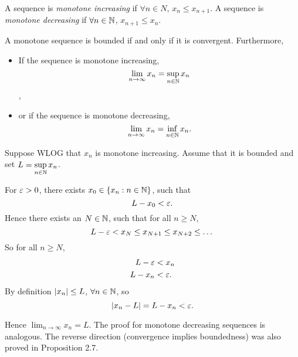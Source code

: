 \documentclass[12pt]{article}
\theoremstyle{definition}
\renewenvironment{proof}[1][\proofname]{\vspace{-10pt}\begin{replacementproof}}{\end{replacementproof}}
\begin{document}
    \begin{definition}[Monotonicity]
        A sequence is \textit{monotone increasing} if $\forall n \in N$, $x_{n} \leq x_{n + 1}$. 
        A sequence is \textit{monotone decreasing} if $\forall n \in \mathbb{N}$, $x_{n + 1} \leq x_{n}$.
    \end{definition}
    \begin{theorem}
        A monotone sequence is bounded if and only if it is convergent. 
        Furthermore, 
        \begin{itemize}
            \item If the sequence is monotone increasing, 
            \begin{equation*}
                \lim_{n \rightarrow \infty}x_{n} = \sup_{n \in \mathbb{N}}x_{n}
            \end{equation*},
            \item or if the sequence is monotone decreasing, 
            \begin{equation*}
                \lim_{n \rightarrow \infty}x_{n} = \inf_{n \in \mathbb{N}}x_{n}.
            \end{equation*}
        \end{itemize}
    \end{theorem}
    \begin{proof}
        Suppose WLOG that $x_{n}$ is monotone increasing. Assume that it is bounded and set $L = \displaystyle\sup_{n \in \mathbb{N}}x_{n}$.

        For $\varepsilon > 0$, there exists $x_{0} \in \left\{x_{n}: n \in \mathbb{N}\right\}$, such that 
        \begin{equation*}
            L - x_{0} < \varepsilon.
        \end{equation*}
        Hence there exists an $N \in \mathbb{N}$, such that for all $n \geq N$,
        \begin{equation*}
            L - \varepsilon < x_{N} \leq x_{N + 1} \leq x_{N + 2} \leq \dots
        \end{equation*} 
        So for all $n \geq {N}$, 
        \begin{align*}
            L - \varepsilon &< x_{n} \\
            L - x_{n} &< \varepsilon.
        \end{align*}
        By definition $\left|x_{n}\right| \leq L$, $\forall n \in \mathbb{N}$, so
        \begin{equation*}
            \left|x_{n} - L\right| = L - x_{n} < \varepsilon.
        \end{equation*}

        Hence $\lim_{n \rightarrow \infty}x_{n} = L$. The proof for monotone decreasing sequences is analogous. The reverse direction (convergence implies boundedness) was also proved in Proposition 2.7.
    \end{proof}
\end{document}

